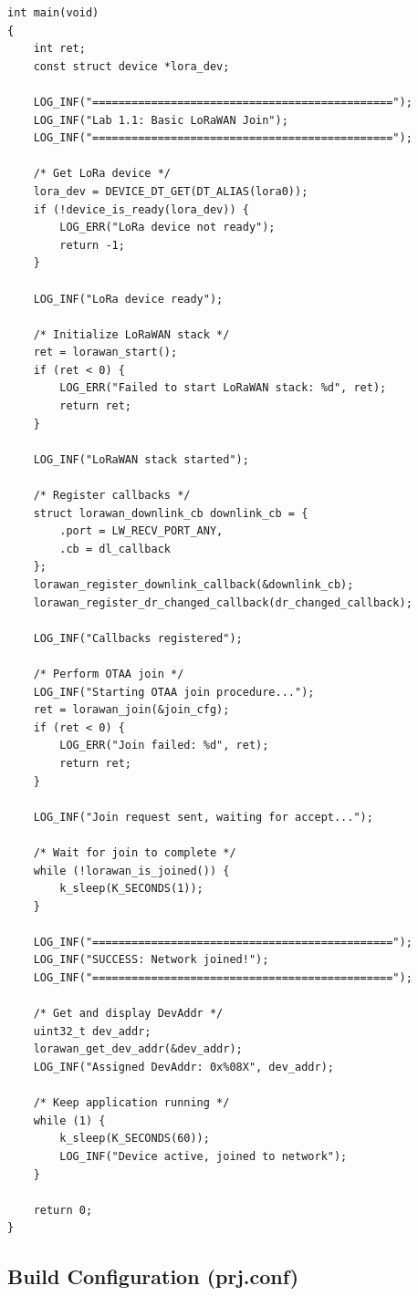 \documentclass[11pt,a4paper]{article}
\begin{document}
\begin{solutionbox}
\begin{lstlisting}
int main(void)
{
    int ret;
    const struct device *lora_dev;

    LOG_INF("==============================================");
    LOG_INF("Lab 1.1: Basic LoRaWAN Join");
    LOG_INF("==============================================");

    /* Get LoRa device */
    lora_dev = DEVICE_DT_GET(DT_ALIAS(lora0));
    if (!device_is_ready(lora_dev)) {
        LOG_ERR("LoRa device not ready");
        return -1;
    }

    LOG_INF("LoRa device ready");

    /* Initialize LoRaWAN stack */
    ret = lorawan_start();
    if (ret < 0) {
        LOG_ERR("Failed to start LoRaWAN stack: %d", ret);
        return ret;
    }

    LOG_INF("LoRaWAN stack started");

    /* Register callbacks */
    struct lorawan_downlink_cb downlink_cb = {
        .port = LW_RECV_PORT_ANY,
        .cb = dl_callback
    };
    lorawan_register_downlink_callback(&downlink_cb);
    lorawan_register_dr_changed_callback(dr_changed_callback);

    LOG_INF("Callbacks registered");

    /* Perform OTAA join */
    LOG_INF("Starting OTAA join procedure...");
    ret = lorawan_join(&join_cfg);
    if (ret < 0) {
        LOG_ERR("Join failed: %d", ret);
        return ret;
    }

    LOG_INF("Join request sent, waiting for accept...");

    /* Wait for join to complete */
    while (!lorawan_is_joined()) {
        k_sleep(K_SECONDS(1));
    }

    LOG_INF("==============================================");
    LOG_INF("SUCCESS: Network joined!");
    LOG_INF("==============================================");

    /* Get and display DevAddr */
    uint32_t dev_addr;
    lorawan_get_dev_addr(&dev_addr);
    LOG_INF("Assigned DevAddr: 0x%08X", dev_addr);

    /* Keep application running */
    while (1) {
        k_sleep(K_SECONDS(60));
        LOG_INF("Device active, joined to network");
    }

    return 0;
}
\end{lstlisting}

\subsection{Build Configuration (prj.conf)}


\end{solutionbox}
\end{document}
